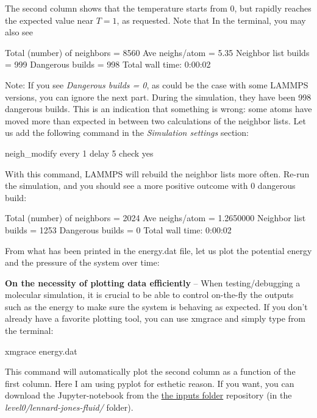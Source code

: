 \noindent The second column shows that the temperature
starts from 0, but rapidly reaches the
expected value near $T=1$, as requested. 
Note that  In the terminal, you may also see

\begin{lcverbatim}
Total (number) of neighbors = 8560
Ave neighs/atom = 5.35
Neighbor list builds = 999
Dangerous builds = 998
Total wall time: 0:00:02
\end{lcverbatim}

\noindent Note: If you see \textit{Dangerous builds = 0}, as could be
the case with some LAMMPS versions, you can ignore
the next part.
During the simulation, they have been 998 dangerous builds.
This is an indication that something is wrong: some atoms
have moved more than expected in between two calculations of
the neighbor lists. Let us add the following command in the
\textit{Simulation settings} section:

\begin{lcverbatim}
neigh_modify every 1 delay 5 check yes
\end{lcverbatim}

\noindent With this command, LAMMPS will rebuild the neighbor lists
more often. Re-run the simulation, and you should see a more
positive outcome with 0 dangerous build:

\begin{lcverbatim}
Total (number) of neighbors = 2024
Ave neighs/atom = 1.2650000
Neighbor list builds = 1253
Dangerous builds = 0
Total wall time: 0:00:02
\end{lcverbatim}

\noindent From what has been printed in the energy.dat file, let us
plot the potential energy and the pressure of
the system over time:

\noindent \textbf{On the necessity of plotting data efficiently} -- When testing/debugging a molecular simulation, it is crucial to be able to control 
on-the-fly the outputs such as the energy to make sure the
system is behaving as expected. If you don't already have 
a favorite plotting tool, you can use xmgrace and simply type from the terminal:
\begin{lcverbatim}
xmgrace energy.dat
\end{lcverbatim}

\noindent This command will automatically plot the second column as a function of the first column.
Here I am using pyplot for esthetic reason. If you want, you can download the Jupyter-notebook
from the \href{https://github.com/lammpstutorials/lammpstutorials.github.io/tree/version2.0/docs/inputs}{the inputs folder} repository (in the \textit{level0/lennard-jones-fluid/} folder).

